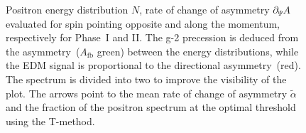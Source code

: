 \begin{refsection}
\begin{figure}
	\hfill
	\caption{Positron energy distribution $N$, rate of change of asymmetry $\partial_\Psi A$ evaluated for spin pointing opposite and along the momentum, respectively for Phase~I and II\@. The g-2 precession is deduced from the asymmetry~($A_\mathrm{fb}$ green) between the energy distributions, while the EDM signal is proportional to the directional asymmetry~(red). The spectrum is divided into two to improve the visibility of the plot. The arrows point to the mean rate of change of asymmetry $\tilde \alpha$ and the fraction of the positron spectrum at the optimal threshold using the T-method.
 }
	\label{fig:n_dot_a}
\end{figure}



\end{refsection}
